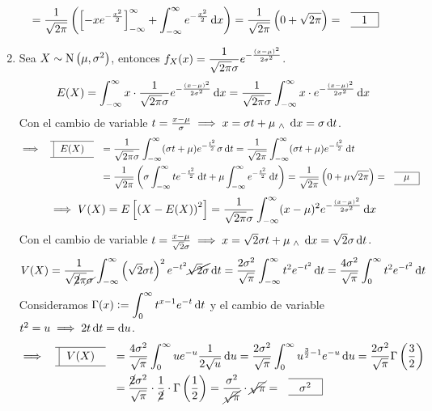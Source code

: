 \begin{ejem}
\begin{enumerate}
\[\begin{aligned}
				                  & = \frac{1}{\sqrt{2\pi}} \left(\left[-xe^{-\frac{x^2}{2}}\right]_{-\infty}^{\infty} + \int_{-\infty}^{\infty} e^{-\frac{x^2}{2}} \odif{x}\right) = \frac{1}{\sqrt{2\pi}} \left(0 + \sqrt{2\pi}\right) = \rbox{1}
			      \end{aligned}\]
		\item Sea $X\sim\operatorname{N}\left(\mu, \sigma^2\right)$, entonces $\displaystyle f_X(x)=\frac{1}{\sqrt{2\pi}\sigma} e^{-\frac{(x-\mu)^2}{2\sigma^2}}$.
		      \[E(X) = \int_{-\infty}^{\infty} x \cdot \frac{1}{\sqrt{2\pi}\sigma} e^{-\frac{(x-\mu)^2}{2\sigma^2}} \odif{x} = \frac{1}{\sqrt{2\pi}\sigma} \int_{-\infty}^{\infty} x \cdot e^{-\frac{(x-\mu)^2}{2\sigma^2}} \odif{x}\]
		      Con el cambio de variable $t=\frac{x-\mu}{\sigma} \implies x=\sigma t + \mu \we \odif{x} = \sigma \odif{t}$.
		      \[\begin{aligned}
				      \implies\lbox{E(X)} & = \frac{1}{\sqrt{2\pi}\sigma} \int_{-\infty}^{\infty} (\sigma t + \mu) e^{-\frac{t^2}{2}} \sigma \odif{t} = \frac{1}{\sqrt{2\pi}} \int_{-\infty}^{\infty} (\sigma t + \mu) e^{-\frac{t^2}{2}} \odif{t}                            \\
				                          & = \frac{1}{\sqrt{2\pi}} \left(\sigma \int_{-\infty}^{\infty} t e^{-\frac{t^2}{2}} \odif{t} + \mu \int_{-\infty}^{\infty} e^{-\frac{t^2}{2}} \odif{t}\right) = \frac{1}{\sqrt{2\pi}} \left(0 + \mu \sqrt{2\pi}\right) = \rbox{\mu}
			      \end{aligned}\]
		      \[\implies V(X) = E\left[\left(X-E(X)\right)^2\right]= \frac{1}{\sqrt{2\pi}\sigma} \int_{-\infty}^{\infty} (x-\mu)^2 e^{-\frac{(x-\mu)^2}{2\sigma^2}} \odif{x}\]
		      Con el cambio de variable $t=\frac{x-\mu}{\sqrt{2}\sigma} \implies x=\sqrt{2}\sigma t + \mu \we \odif{x} = \sqrt{2}\sigma \odif{t}$.
		      \[V(X) = \frac{1}{\sqrt{\cancel{2}\pi}\cancel{\sigma}} \int_{-\infty}^{\infty} \left(\sqrt{2}\sigma t\right)^2 e^{-t^2} \cancel{\sqrt{2}\sigma} \odif{t} = \frac{2\sigma^2}{\sqrt{\pi}} \int_{-\infty}^{\infty} t^2 e^{-t^2} \odif{t} = \frac{4\sigma^2}{\sqrt{\pi}} \int_{0}^{\infty} t^2 e^{-t^2} \odif{t}\]
		      Consideramos $\ds \Gamma(x) \defeq \int_{0}^{\infty} t^{x-1} e^{-t} \odif{t}$ y el cambio de variable $t^2 = u \implies 2t \odif{t} = \odif{u}$.
		      \[\begin{aligned}
				      \implies \lbox{V(X)} & = \frac{4\sigma^2}{\sqrt{\pi}} \int_{0}^{\infty} u e^{-u} \frac{1}{2\sqrt{u}} \odif{u} = \frac{2\sigma^2}{\sqrt{\pi}} \int_{0}^{\infty} u^{\frac{3}{2} - 1}e^{-u} \odif{u} = \frac{2\sigma^2}{\sqrt{\pi}} \Gamma\left(\frac{3}{2}\right) \\
				                           & = \frac{\cancel{2}\sigma^2}{\sqrt{\pi}} \cdot \frac{1}{\cancel{2}} \cdot \Gamma\left(\frac{1}{2}\right) = \frac{\sigma^2}{\cancel{\sqrt{\pi}}} \cdot \cancel{\sqrt{\pi}} = \rbox{\sigma^2}
			      \end{aligned}\]
	\end{enumerate}
\end{ejem}
